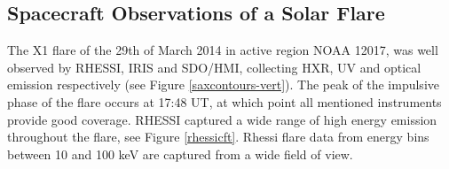 



\subsection{Spacecraft Observations of a Solar Flare}
The X1 flare of the 29th of March 2014 in active region NOAA 12017, was well observed by RHESSI, IRIS and SDO/HMI, collecting HXR, UV and optical emission respectively (see Figure \ref{saxcontours-vert}). The peak of the impulsive phase of the flare occurs at 17:48 UT, at which point all mentioned instruments provide good coverage. RHESSI captured a wide range of high energy emission throughout the flare, see Figure \ref{rhessicft}. Rhessi flare data from energy bins between 10 and 100 keV are captured from a wide field of view.%

